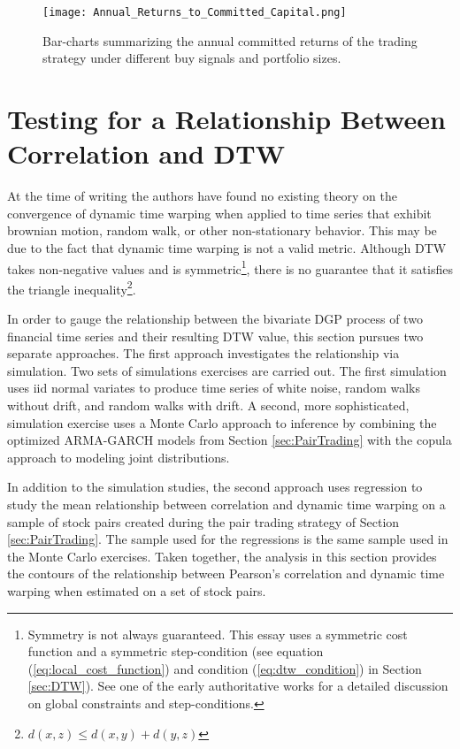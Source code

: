 \documentclass[12pt]{report}
\begin{document}
\begin{landscape}
    \begin{figure}[hp]
        \texttt{[image: Annual\_Returns\_to\_Committed\_Capital.png]}
        \caption{Bar-charts summarizing the annual committed returns of the trading strategy under different buy signals and portfolio sizes.}
        \label{fig:annual_returns_to_committed_capital_by_buy_signal}
    \end{figure}
\end{landscape}

\chapter{Testing for a Relationship Between Correlation and DTW} \label{sec:Corr_and_DTW_Relationship}

At the time of writing the authors have found no existing theory on the convergence of dynamic time warping when applied to time series that exhibit brownian motion, random walk, or other non-stationary behavior. This may be due to the fact that dynamic time warping is not a valid metric. Although DTW takes non-negative values and is symmetric\footnote{Symmetry is not always guaranteed. This essay uses a symmetric cost function and a symmetric step-condition (see equation (\ref{eq:local_cost_function}) and condition (\ref{eq:dtw_condition}) in Section \ref{sec:DTW}). See one of the early authoritative works \cite{SakoeChiba_IEEE_1978} for a detailed discussion on global constraints and step-conditions.}, there is no guarantee that it satisfies the triangle inequality\footnote{$d(x, z) \leq d(x, y) + d(y, z)$}. 

In order to gauge the relationship between the bivariate DGP process of two financial time series and their resulting DTW value, this section pursues two separate approaches. The first approach investigates the relationship via simulation. Two sets of simulations exercises are carried out. The first simulation uses iid normal variates to produce time series of white noise, random walks without drift, and random walks with drift. A second, more sophisticated, simulation exercise uses a Monte Carlo approach to inference by combining the optimized ARMA-GARCH models from Section \ref{sec:PairTrading} with the copula approach to modeling joint distributions.

In addition to the simulation studies, the second approach uses regression to study the mean relationship between correlation and dynamic time warping on a sample of stock pairs created during the pair trading strategy of Section \ref{sec:PairTrading}. The sample used for the regressions is the same sample used in the Monte Carlo exercises. Taken together, the analysis in this section provides the contours of the relationship between Pearson's correlation and dynamic time warping when estimated on a set of stock pairs. 
\end{document}
